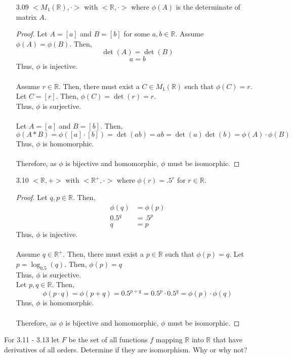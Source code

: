 \documentclass[12pt]{article}
\newcommand{\R}{\mathbb{R}}
\begin{document}
\begin{enumerate}
\begin{enumerate}
			\item[3.09] $<M_1(\R),\cdot>$ with $<\R,\cdot>$ where $\phi(A)$ is the determinate of matrix $A$.
				\begin{proof}
					Let $ A=[a]$ and $B=[b]$ for some $a,b\in\R$.
					 Assume $ \phi(A) = \phi(B)$. Then, 
					 	\[\det(A) = \det(B)\]
					 	\[a = b\]
					 	Thus, $ \phi $ is injective.\\
					\\
					 Assume $ r \in \R $. Then, there must exist a $ C \in M_1(\R) $ such that $ \phi(C) = r $.\\
					 Let $ C=[r] $. Then, $ \phi(C)=\det(r)=r $. \\
					 Thus, $ \phi $ is surjective.\\
					 \\
					 Let $ A=[a] $ and $ B=[b] $. Then, 
					 	\[\phi(A*B)=\phi([a]\cdot[b])=\det(ab)=ab=\det(a)\det(b)=\phi(A)\cdot\phi(B)\]
					 Thus, $ \phi $ is homomorphic.\\
					 \\
					 Therefore, as $ \phi $ is bijective and homomorphic, $ \phi $ must be isomorphic.
				\end{proof}
			\item[3.10] $<\R,+>$ with $<\R^+,\cdot>$ where $\phi (r) = .5^r$ for $r \in \R$.
				\begin{proof}
					Let $q,p\in\R$. Then,
						\begin{align*}
							\phi(q)&=\phi(p)\\
						      0.5^q&=.5^p\\
								  q&=p
						\end{align*}
						Thus, $ \phi $ is injective.\\
						\\
						Assume $ q\in\R^+ $. Then, there must exist a $ p\in\R $ such that $ \phi(p)=q $.
						Let $ p=\log_{0.5}(q) $. Then, $ \phi(p)=q $\\
						Thus, $ \phi $ is surjective.
						\\
						Let $ p,q\in\R$. Then,
							\[\phi(p\cdot q)=\phi(p+q)=0.5^{p+q}=0.5^p\cdot 0.5^q=\phi(p)\cdot\phi(q)\]
						Thus, $ \phi $ is homomorphic.\\
						\\
						 Therefore, as $ \phi $ is bijective and homomorphic, $ \phi $ must be isomorphic.
				\end{proof}
		\end{enumerate}
		
		For 3.11 - 3.13 let $F$ be the set of all functions $f$ mapping $\R$ into $\R$ that have derivatives of all orders. Determine if they are isomorphism. Why or why not?
		

\end{enumerate}
\end{document}
